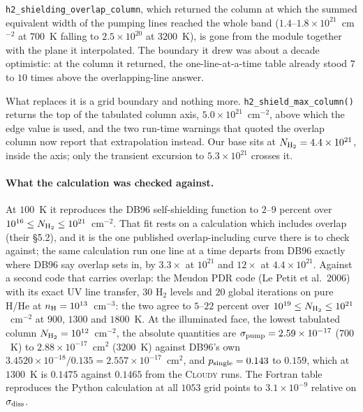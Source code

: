 \documentclass[english,a4paper]{my_memo}
\begin{document}
\texttt{h2\_shielding\_overlap\_column}, which returned the column at which
the summed equivalent width of the pumping lines reached the whole band
($1.4$--$1.8\times10^{21}$~cm$^{-2}$ at $700$~K falling to
$2.5\times10^{20}$ at $3200$~K), is gone from the module together with the
plane it interpolated. The boundary it drew was about a decade optimistic: at
the column it returned, the one-line-at-a-time table already stood $7$ to $10$
times above the overlapping-line answer.

What replaces it is a grid boundary and nothing more.
\texttt{h2\_shield\_max\_column()} returns the top of the tabulated column
axis, $5.0\times10^{21}$~cm$^{-2}$, above which the edge value is used, and
the two run-time warnings that quoted the overlap column now report that
extrapolation instead. Our base sits at $N_{\rm H_2} = 4.4\times10^{21}$,
inside the axis; only the transient excursion to $5.3\times10^{21}$ crosses
it.

\paragraph{What the calculation was checked against.} At $100$~K it reproduces
the DB96 self-shielding function to $2$--$9$ percent over
$10^{16} \le N_{\rm H_2} \le 10^{21}$~cm$^{-2}$. That fit rests on a
calculation which includes overlap (their \S5.2), and it is the one published
overlap-including curve there is to check against; the same calculation run
one line at a time departs from DB96 exactly where DB96 say overlap sets in,
by $3.3\times$ at $10^{21}$ and $12\times$ at $4.4\times10^{21}$. Against a
second code that carries overlap: the Meudon PDR code (Le Petit et al.\
2006) with its exact UV line transfer, $30$ H$_2$ levels and $20$ global
iterations on pure H/He at $n_{\rm H} = 10^{13}$~cm$^{-3}$: the two agree
to $5$--$22$ percent over $10^{19} \le N_{\rm H_2} \le 10^{21}$~cm$^{-2}$ at
$900$, $1300$ and $1800$~K. At the illuminated face, the lowest tabulated
column $N_{\rm H_2} = 10^{12}$~cm$^{-2}$, the absolute quantities are
$\sigma_{\rm pump} = 2.59\times10^{-17}$ ($700$~K) to
$2.88\times10^{-17}$~cm$^2$ ($3200$~K) against DB96's own
$3.4520\times10^{-18}/0.135 = 2.557\times10^{-17}$~cm$^2$, and
$p_{\rm single} = 0.143$ to $0.159$, which at $1300$~K is $0.1475$ against
$0.1465$ from the \textsc{Cloudy} runs. The Fortran table reproduces the
Python calculation at all $1053$ grid points to $3.1\times10^{-9}$ relative on
$\sigma_{\rm diss}$.
\end{document}
